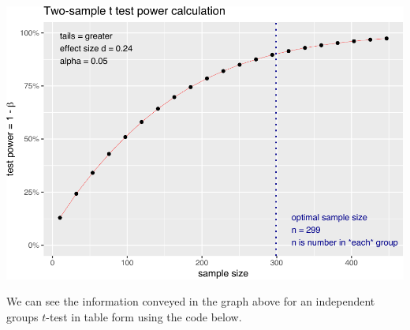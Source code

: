 \documentclass[
]{krantz}
\begin{document}
\includegraphics{bookdown_files/figure-latex/unnamed-chunk-240-1.pdf}

We can see the information conveyed in the graph above for an independent groups \(t\)-test in table form using the code below.
\end{document}

